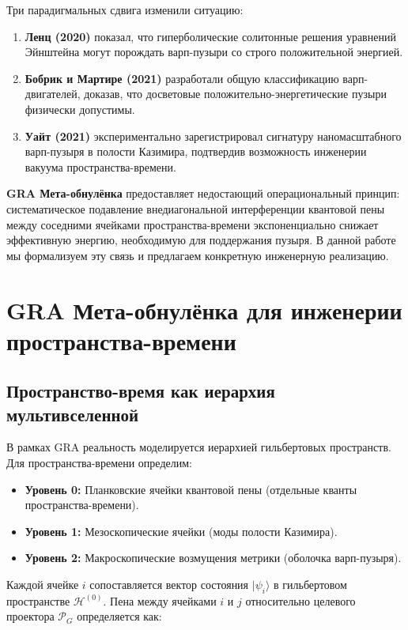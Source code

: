 \documentclass[11pt]{article}
\begin{document}
Три парадигмальных сдвига изменили ситуацию:

\begin{enumerate}
    \item \textbf{Ленц (2020)} показал, что гиперболические солитонные решения уравнений Эйнштейна могут порождать варп-пузыри со строго положительной энергией.
    \item \textbf{Бобрик и Мартире (2021)} разработали общую классификацию варп-двигателей, доказав, что досветовые положительно-энергетические пузыри физически допустимы.
    \item \textbf{Уайт (2021)} экспериментально зарегистрировал сигнатуру наномасштабного варп-пузыря в полости Казимира, подтвердив возможность инженерии вакуума пространства-времени.
\end{enumerate}

\textbf{GRA Мета-обнулёнка} предоставляет недостающий операциональный принцип: систематическое подавление внедиагональной интерференции квантовой пены между соседними ячейками пространства-времени экспоненциально снижает эффективную энергию, необходимую для поддержания пузыря. В данной работе мы формализуем эту связь и предлагаем конкретную инженерную реализацию.

\section{GRA Мета-обнулёнка для инженерии пространства-времени}

\subsection{Пространство-время как иерархия мультивселенной}

В рамках GRA реальность моделируется иерархией гильбертовых пространств. Для пространства-времени определим:

\begin{itemize}
    \item \textbf{Уровень 0:} Планковские ячейки квантовой пены (отдельные кванты пространства-времени).
    \item \textbf{Уровень 1:} Мезоскопические ячейки (моды полости Казимира).
    \item \textbf{Уровень 2:} Макроскопические возмущения метрики (оболочка варп-пузыря).
\end{itemize}

Каждой ячейке $i$ сопоставляется вектор состояния $|\psi_i\rangle$ в гильбертовом пространстве $\mathcal{H}^{(0)}$. Пена между ячейками $i$ и $j$ относительно целевого проектора $\mathcal{P}_G$ определяется как:
\end{document}
